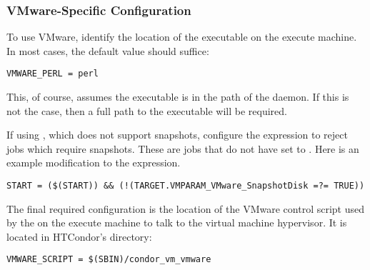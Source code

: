 
\subsubsection{VMware-Specific Configuration}

To use VMware, identify the location of the  executable
on the execute machine.
In most cases, the default value should suffice:

\begin{verbatim}
VMWARE_PERL = perl
\end{verbatim}

This, of course, assumes the  executable is in the path
of the  daemon.
If this is not the case,
then a full path to the  executable will be required.

If using , 
which does not support snapshots,
configure the  expression to reject
jobs which require snapshots.
These are jobs that do not have 
 set to .
Here is an example modification to the  expression. 
\begin{verbatim}
START = ($(START)) && (!(TARGET.VMPARAM_VMware_SnapshotDisk =?= TRUE))
\end{verbatim}

The final required configuration is the location of the VMware control script
used by the  on the execute machine
to talk to the virtual machine hypervisor.
It is located in HTCondor's  directory:

\begin{verbatim}
VMWARE_SCRIPT = $(SBIN)/condor_vm_vmware
\end{verbatim}

